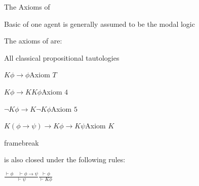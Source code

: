 The Axioms of 
\begin{itemizedot}
  \item Basic  of one agent is generally assumed to be the modal
  logic 
  
  \item The axioms of  are:
  \begin{itemizedot}
    \item All classical propositional tautologies
    
    \item $K \phi \rightarrow \phi${\hspace*{\fill}}Axiom $T$
    
    
    \item $K \phi \rightarrow K K \phi${\hspace*{\fill}}Axiom $4$
    
    
    \item $\neg K \phi \rightarrow K \neg K \phi${\hspace*{\fill}}Axiom $5$
    
    
    \item $K (\phi \rightarrow \psi) \rightarrow K \phi \rightarrow K
    \psi${\hspace*{\fill}}Axiom $K$
    
  \end{itemizedot}
\end{itemizedot}
framebreak
\begin{itemizedot}
  \item {} is also closed under the following rules:
  
  {\hspace*{\fill}}$\displaystyle \frac{\vdash \phi \hspace{1em} \vdash \phi \rightarrow
  \psi}{\vdash \psi}${\hspace*{\fill}}$\displaystyle \frac{\vdash \phi}{\vdash K
  \phi}${\hspace*{\fill}}
\end{itemizedot}
